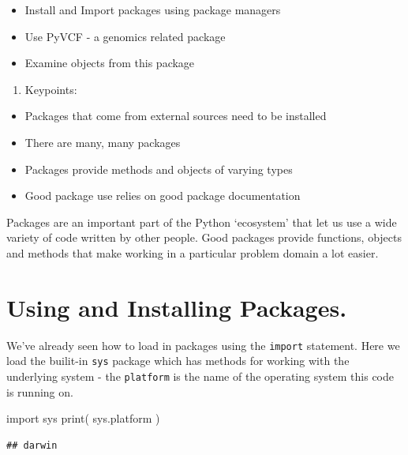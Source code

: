 \documentclass[]{book}
\newenvironment{Shaded}{\begin{snugshade}}{\end{snugshade}}
\newcommand{\BuiltInTok}[1]{#1}
\newcommand{\ImportTok}[1]{#1}
\newcommand{\NormalTok}[1]{#1}
\providecommand{\tightlist}{%
  \setlength{\itemsep}{0pt}\setlength{\parskip}{0pt}}
\theoremstyle{definition}
\theoremstyle{definition}
\theoremstyle{definition}
\theoremstyle{remark}
\begin{document}
\begin{itemize}
\tightlist
\item
  Install and Import packages using package managers
\item
  Use PyVCF - a genomics related package
\item
  Examine objects from this package
\end{itemize}

\begin{enumerate}
\def\labelenumi{\arabic{enumi}.}
\setcounter{enumi}{2}
\tightlist
\item
  Keypoints:
\end{enumerate}

\begin{itemize}
\tightlist
\item
  Packages that come from external sources need to be installed
\item
  There are many, many packages
\item
  Packages provide methods and objects of varying types
\item
  Good package use relies on good package documentation
\end{itemize}

Packages are an important part of the Python `ecosystem' that let us use
a wide variety of code written by other people. Good packages provide
functions, objects and methods that make working in a particular problem
domain a lot easier.

\hypertarget{using-and-installing-packages.}{%
\section{Using and Installing
Packages.}\label{using-and-installing-packages.}}

We've already seen how to load in packages using the \texttt{import}
statement. Here we load the builit-in \texttt{sys} package which has
methods for working with the underlying system - the \texttt{platform}
is the name of the operating system this code is running on.

\begin{Shaded}
\begin{Highlighting}[]
\ImportTok{import}\NormalTok{ sys}
\BuiltInTok{print}\NormalTok{( sys.platform )}
\end{Highlighting}
\end{Shaded}

\begin{verbatim}
## darwin
\end{verbatim}
\end{document}
